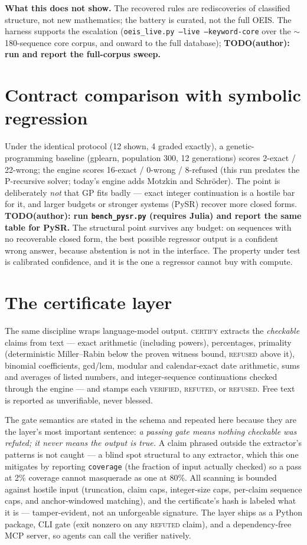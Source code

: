 \documentclass[11pt]{article}
\newcommand{\Verified}{\textsc{verified}}
\newcommand{\Refused}{\textsc{refused}}
\newcommand{\Refuted}{\textsc{refuted}}
\begin{document}
\textbf{What this does not show.} The recovered rules are rediscoveries of
classified structure, not new mathematics; the battery is curated, not the
full OEIS. The harness supports the escalation
(\texttt{oeis\_live.py --live --keyword-core} over the $\sim$180-sequence
core corpus, and onward to the full database);
\textbf{TODO(author): run and report the full-corpus sweep.}

\section{Contract comparison with symbolic regression}\label{sec:baselines}
Under the identical protocol (12 shown, 4 graded exactly), a
genetic-programming baseline (gplearn, population 300, 12 generations)
scores 2-exact / 22-wrong; the engine scores 16-exact / 0-wrong / 8-refused
(this run predates the P-recursive solver; today's engine adds Motzkin and
Schr\"oder). The point is deliberately \emph{not} that GP fits badly ---
exact integer continuation is a hostile bar for it, and larger budgets or
stronger systems (PySR) recover more closed forms.
\textbf{TODO(author): run \texttt{bench\_pysr.py} (requires Julia) and
report the same table for PySR.} The structural point survives any budget:
on sequences with no recoverable closed form, the best possible regressor
output is a confident wrong answer, because abstention is not in the
interface. The property under test is calibrated confidence, and it is the
one a regressor cannot buy with compute.

\section{The certificate layer}\label{sec:certify}
The same discipline wraps language-model output. \textsc{certify} extracts
the \emph{checkable} claims from text --- exact arithmetic (including
powers), percentages, primality (deterministic Miller--Rabin below the
proven witness bound, \Refused{} above it), binomial coefficients,
gcd/lcm, modular and calendar-exact date arithmetic, sums and averages of
listed numbers, and integer-sequence continuations checked through the
engine --- and stamps each \Verified{}, \Refuted{}, or \Refused{}. Free
text is reported as unverifiable, never blessed.

The gate semantics are stated in the schema and repeated here because they
are the layer's most important sentence: \emph{a passing gate means nothing
checkable was refuted; it never means the output is true.} A claim phrased
outside the extractor's patterns is not caught --- a blind spot structural
to any extractor, which this one mitigates by reporting \texttt{coverage}
(the fraction of input actually checked) so a pass at 2\% coverage cannot
masquerade as one at 80\%. All scanning is bounded against hostile input
(truncation, claim caps, integer-size caps, per-claim sequence caps, and
anchor-windowed matching), and the certificate's hash is labeled what it is
--- tamper-evident, not an unforgeable signature. The layer ships as a
Python package, CLI gate (exit nonzero on any \Refuted{} claim), and a
dependency-free MCP server, so agents can call the verifier natively.
\end{document}
